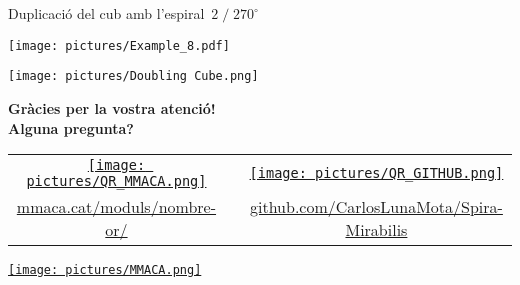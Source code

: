 \documentclass[14pt]{beamer}
\begin{document}
    
    \begin{frame}{Duplicació del cub amb l'espiral\, $2\;/\;270^\circ$}
        \begin{center}
            \begin{minipage}{25ex}
                \texttt{[image: pictures/Example\_8.pdf]}
            \end{minipage} \begin{minipage}{25ex}
                \texttt{[image: pictures/Doubling Cube.png]}
            \end{minipage}
        \end{center}
    \end{frame}
    

    \begin{frame}{}
        \begin{center}
            \textbf{\Large Gràcies per la vostra atenció!\\[1ex]Alguna pregunta?}

            \bigskip

            {\tiny \begin{tabular}{ccc}
              \href{https://mmaca.cat/moduls/nombre-or/}{\texttt{[image: pictures/QR\_MMACA.png]}} & \qquad &
              \href{https://github.com/CarlosLunaMota/Spira-Mirabilis}{\texttt{[image: pictures/QR\_GITHUB.png]}}\\[1ex]
              \href{https://mmaca.cat/moduls/nombre-or/}{mmaca.cat/moduls/nombre-or/} & &
              \href{https://github.com/CarlosLunaMota/Spira-Mirabilis}{github.com/CarlosLunaMota/Spira-Mirabilis}\\
            \end{tabular}}
            
            \bigskip \bigskip

            \href{https://mmaca.cat/}{\texttt{[image: pictures/MMACA.png]}}
            
        \end{center}
    \end{frame}
    
\end{document}
